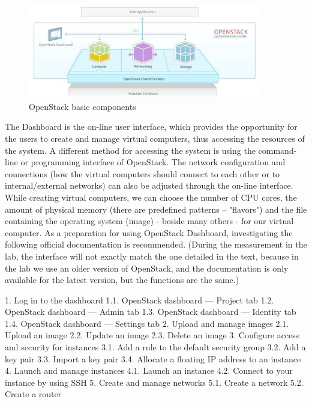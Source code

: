 \documentclass[a4paper]{article}
\begin{document}
\begin{figure}[H]
    \centering
    \includegraphics[width=0.9\textwidth]{figures/components.png}
    \caption{OpenStack basic components}
    \label{fig:oscomponents}
\end{figure}

The Dashboard is the on-line user interface, which provides the opportunity for the users to create and manage virtual
computers, thus accessing the resources of the system. A different method for accessing the system is using the
command-line or programming interface of OpenStack. The network configuration and connections (how the virtual
computers should connect to each other or to internal/external networks) can also be adjusted through the on-line
interface. While creating virtual computers, we can choose the number of CPU cores, the amount of physical memory
(there are predefined patterns – "flavors") and the file containing the operating system (image) - beside many others -
for our virtual computer.
As a preparation for using OpenStack Dashboard, investigating the following official documentation is recommended.
(During the measurement in the lab, the interface will not exactly match the one detailed in the text, because in the
lab we use an older version of OpenStack, and the documentation is only available for the latest version, but the
functions are the same.)

1.  Log in to the dashboard
1.1.  OpenStack dashboard — Project tab
1.2.  OpenStack dashboard — Admin tab
1.3.  OpenStack dashboard — Identity tab
1.4.  OpenStack dashboard — Settings tab
2.  Upload and manage images
2.1.  Upload an image
2.2.  Update an image
2.3.  Delete an image
3.  Configure access and security for instances
3.1.  Add a rule to the default security group
3.2.  Add a key pair
3.3.  Import a key pair
3.4.  Allocate a floating IP address to an instance
4.  Launch and manage instances
4.1.  Launch an instance
4.2.  Connect to your instance by using SSH
5.  Create and manage networks
5.1.  Create a network
5.2.  Create a router
\end{document}
